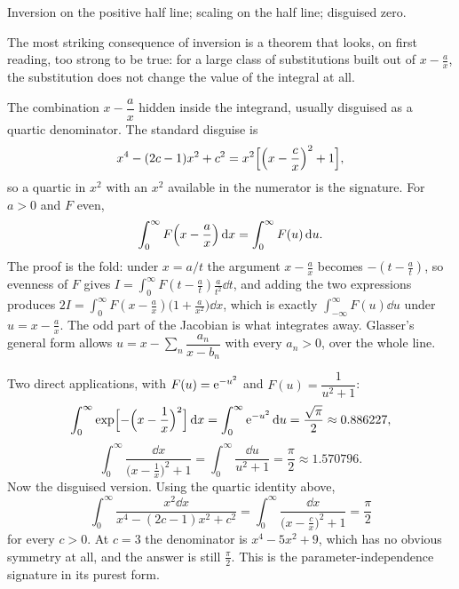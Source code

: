 \begin{seealsob}Inversion on the positive half line; scaling on the half line; disguised zero.\end{seealsob}

The most striking consequence of inversion is a theorem that looks, on first reading, too strong to be true: for a large class of substitutions built out of $x-\tfrac ax$, the substitution does not change the value of the integral at all.

\cue The combination $x-\dfrac{a}{x}$ hidden inside the integrand, usually disguised as a quartic denominator. The standard disguise is
\[x^{4}-(2c-1)x^{2}+c^{2}=x^{2}\Bigl[\Bigl(x-\frac{c}{x}\Bigr)^{2}+1\Bigr],\]
so a quartic in $x^{2}$ with an $x^{2}$ available in the numerator is the signature.
\method For $a>0$ and $F$ even,
\[\int_0^{\infty}F\Bigl(x-\frac{a}{x}\Bigr)\,\mathrm{d} x=\int_0^{\infty}F(u)\,\mathrm{d} u.\]
The proof is the fold: under $x=a/t$ the argument $x-\tfrac ax$ becomes $-(t-\tfrac at)$, so evenness of $F$ gives $I=\int_0^{\infty}F(t-\tfrac at)\tfrac{a}{t^{2}}\dd t$, and adding the two expressions produces $2I=\int_0^{\infty}F(x-\tfrac ax)\bigl(1+\tfrac{a}{x^{2}}\bigr)\dd x$, which is exactly $\int_{-\infty}^{\infty}F(u)\dd u$ under $u=x-\tfrac ax$. The odd part of the Jacobian is what integrates away. Glasser's general form allows $u=x-\sum_n\dfrac{a_n}{x-b_n}$ with every $a_n>0$, over the whole line.

\begin{worked}
Two direct applications, with $F(u)=\mathrm{e}^{-u^{2}}$ and $F(u)=\dfrac{1}{u^{2}+1}$:
\[\int_0^{\infty}\exp\Bigl[-\Bigl(x-\frac1x\Bigr)^{2}\Bigr]\,\mathrm{d} x=\int_0^{\infty}\mathrm{e}^{-u^{2}}\,\mathrm{d} u=\frac{\sqrt{\pi}}{2}\approx0.886227,\]
\[\int_0^{\infty}\frac{\dd x}{\bigl(x-\tfrac1x\bigr)^{2}+1}=\int_0^{\infty}\frac{\dd u}{u^{2}+1}=\frac{\pi}{2}\approx1.570796.\]
Now the disguised version. Using the quartic identity above,
\[\int_0^{\infty}\frac{x^{2}\dd x}{x^{4}-(2c-1)x^{2}+c^{2}}=\int_0^{\infty}\frac{\dd x}{\bigl(x-\tfrac cx\bigr)^{2}+1}=\frac{\pi}{2}\]
for every $c>0$. At $c=3$ the denominator is $x^{4}-5x^{2}+9$, which has no obvious symmetry at all, and the answer is still $\tfrac{\pi}{2}$. This is the parameter-independence signature in its purest form.
\end{worked}

